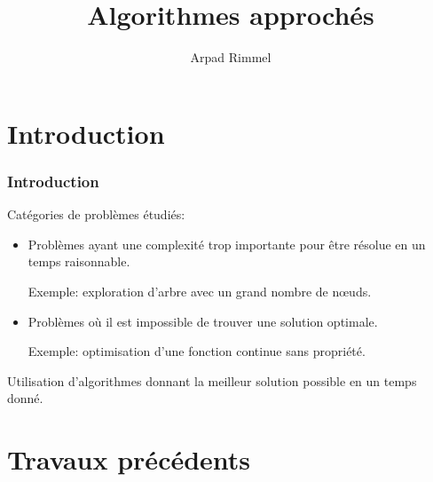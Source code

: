 \documentclass{beamer}
\begin{document}
\title{Algorithmes approchés}

\author{Arpad Rimmel}


\begin{frame}
    \titlepage
\end{frame}


\section{Introduction}


\begin{frame}
    \frametitle{Introduction}
    
    Catégories de problèmes étudiés:
    \begin{itemize}
        \item Problèmes ayant une complexité trop importante pour être résolue en un temps raisonnable.

        Exemple: exploration d'arbre avec un grand nombre de nœuds.

        \item Problèmes où il est impossible de trouver une solution optimale.

        Exemple: optimisation d'une fonction continue sans propriété.
    \end{itemize}

    Utilisation d'algorithmes donnant la meilleur solution possible en un temps donné.

\end{frame}


\section{Travaux précédents}
\end{document}
